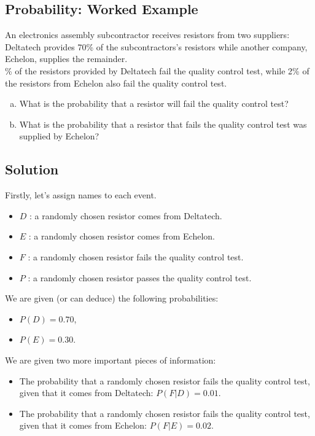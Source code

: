 \documentclass[a4paper,12pt]{article}
\begin{document}
\large 
\subsection*{Probability: Worked Example }
An electronics assembly subcontractor receives resistors from two suppliers: Deltatech provides
70\% of the subcontractors's resistors while another company, Echelon, supplies the remainder.
\\
\% of the resistors provided by Deltatech fail the quality control test, while 2\% of the
resistors from Echelon also fail the quality control test.

\begin{enumerate}[(a)]
\item What is the probability that a resistor will fail the quality control test?
\item What is the probability that a resistor that fails the quality control test was supplied by Echelon?
\end{enumerate}

\subsection*{Solution}
Firstly, let's assign names to each event.
\begin{itemize}
\item $D$ : a randomly chosen resistor comes from Deltatech.
\item $E$ : a randomly chosen resistor comes from Echelon.
\item $F$ : a randomly chosen resistor fails the quality control test.
\item $P$ : a randomly chosen resistor passes the quality control test.
\end{itemize}
\bigskip

\noindent We are given (or can deduce) the following probabilities:
\begin{itemize}
\item $P(D) = 0.70$,
\item $P(E) = 0.30$.
\end{itemize}
\medskip


\noindent We are given two more important pieces of information:
\begin{itemize}
\item The probability that a randomly chosen resistor fails the quality control test, given that it comes from Deltatech: $P(F|D) = 0.01 $.
\item The probability that a randomly chosen resistor fails the quality control test, given that it comes from Echelon: $P(F|E) = 0.02$.
\end{itemize}
\end{document}
